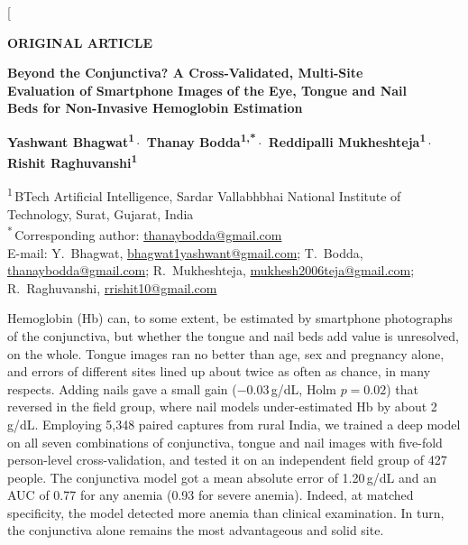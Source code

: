\documentclass[10pt,a4paper,twocolumn]{article}
\newcommand{\gdl}{\,g/dL}
\begin{document}
\twocolumn[
\begin{@twocolumnfalse}
\thispagestyle{firstpage}
\vspace*{-2mm}
\noindent\colorbox{bannergray}{\parbox{0.45\textwidth}{\sffamily\bfseries\small\hspace{2mm}ORIGINAL ARTICLE\vphantom{Ag}}}

\vspace{6mm}
{\noindent\sffamily\bfseries\LARGE Beyond the Conjunctiva? A Cross-Validated, Multi-Site\\[2pt]
Evaluation of Smartphone Images of the Eye, Tongue and Nail\\[2pt]
Beds for Non-Invasive Hemoglobin Estimation\par}

\vspace{5mm}
{\noindent\sffamily\bfseries\normalsize
Yashwant Bhagwat\textsuperscript{1}\,$\cdot$\,
Thanay Bodda\textsuperscript{1,*}\,$\cdot$\,
Reddipalli Mukheshteja\textsuperscript{1}\,$\cdot$\,
Rishit Raghuvanshi\textsuperscript{1}\par}

\vspace{3mm}
{\noindent\small
\textsuperscript{1}\,BTech Artificial Intelligence, Sardar Vallabhbhai National Institute of Technology, Surat, Gujarat, India\\
\textsuperscript{*}\,Corresponding author: \href{mailto:thanaybodda@gmail.com}{thanaybodda@gmail.com}\\
E-mail: Y.~Bhagwat, \href{mailto:bhagwat1yashwant@gmail.com}{bhagwat1yashwant@gmail.com};
T.~Bodda, \href{mailto:thanaybodda@gmail.com}{thanaybodda@gmail.com};
R.~Mukheshteja, \href{mailto:mukhesh2006teja@gmail.com}{mukhesh2006teja@gmail.com};
R.~Raghuvanshi, \href{mailto:rrishit10@gmail.com}{rrishit10@gmail.com}\par}

\vspace{5mm}
\par\vspace{1mm}
\noindent Hemoglobin (Hb) can, to some extent, be estimated by smartphone photographs of the conjunctiva, but whether the tongue and nail beds add value is unresolved, on the whole. Tongue images ran no better than age, sex and pregnancy alone, and errors of different sites lined up about twice as often as chance, in many respects. Adding nails gave a small gain ($-0.03$\gdl, Holm $p=0.02$) that reversed in the field group, where nail models under-estimated Hb by about 2\gdl. Employing 5,348 paired captures from rural India, we trained a deep model on all seven combinations of conjunctiva, tongue and nail images with five-fold person-level cross-validation, and tested it on an independent field group of 427 people. The conjunctiva model got a mean absolute error of 1.20\gdl{} and an AUC of 0.77 for any anemia (0.93 for severe anemia). Indeed, at matched specificity, the model detected more anemia than clinical examination. In turn, the conjunctiva alone remains the most advantageous and solid site.


\end{@twocolumnfalse}
\end{document}
